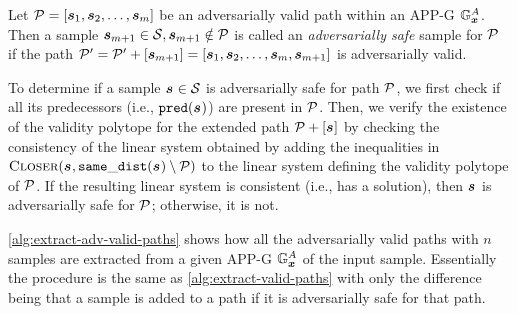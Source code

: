 \begin{definition}
Let $\vpath = [\sample[1], \sample[2],\ldots, \sample[m]]$ be an adversarially valid path within an \acs{APP-G} $\APPG$. Then a sample $ \sample[m+1] \in \set, \sample[m+1] \notin \vpath$ is called an \emph{adversarially safe} sample for $\vpath$ if the path $\vpath' = \vpath' + [\sample[m+1]]=[\sample[1], \sample[2],\ldots, \sample[m], \sample[m+1]]$ is adversarially valid.
\end{definition}

\noindent To determine if a sample $\sample[] \in \set$ is adversarially safe for path $\vpath$, we first check if all its predecessors (i.e., $\pred{\sample[]}$) are present in $\vpath$. Then, we verify the existence of the validity polytope for the extended path $\vpath + [\sample[]]$ by checking the consistency of the linear system obtained by adding the inequalities in $\algtitle{Closer}(\sample[], \samedist{\sample[]}\setminus\vpath)$ to the linear system defining the validity polytope of $\vpath$. If the resulting linear system is consistent (i.e., has a solution), then $\sample[]$ is adversarially safe for $\vpath$; otherwise, it is not.

\autoref{alg:extract-adv-valid-paths} shows how all the adversarially valid paths with $n$ samples are extracted from a given \acs{APP-G} $\APPG$ of the input sample. Essentially the procedure is the same as \autoref{alg:extract-valid-paths} with only the difference being that a sample is added to a path if it is adversarially safe for that path.

